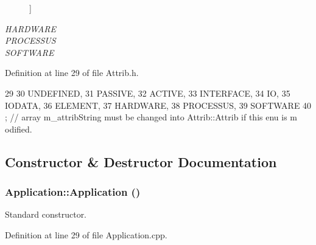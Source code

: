\begin{Desc}
\begin{description}
{}]\item[{\em 
\hypertarget{classAttrib_a69e171d7cc6417835a5a306d3c764235a61ceb22149f365f1780d18f9d1459423}{
HARDWARE}
\label{classAttrib_a69e171d7cc6417835a5a306d3c764235a61ceb22149f365f1780d18f9d1459423}
}]\item[{\em 
\hypertarget{classAttrib_a69e171d7cc6417835a5a306d3c764235a75250e29692496e73effca2c0330977f}{
PROCESSUS}
\label{classAttrib_a69e171d7cc6417835a5a306d3c764235a75250e29692496e73effca2c0330977f}
}]\item[{\em 
\hypertarget{classAttrib_a69e171d7cc6417835a5a306d3c764235a103a67cd0b8f07ef478fa45d4356e27b}{
SOFTWARE}
\label{classAttrib_a69e171d7cc6417835a5a306d3c764235a103a67cd0b8f07ef478fa45d4356e27b}
}]\end{description}
\end{Desc}



Definition at line 29 of file Attrib.h.


\begin{DoxyCode}
29                 {
30     UNDEFINED,
31     PASSIVE,
32     ACTIVE,
33     INTERFACE,
34     IO,
35     IODATA,
36     ELEMENT,
37     HARDWARE,
38     PROCESSUS,
39     SOFTWARE 
40   }; // array m_attribString must be changed into Attrib::Attrib if this enu is m
      odified. 
\end{DoxyCode}


\subsection{Constructor \& Destructor Documentation}
\hypertarget{classApplication_afa8cc05ce6b6092be5ecdfdae44e05f8}{
\subsubsection[{Application}]{\setlength{\rightskip}{0pt plus 5cm}Application::Application ()}}
\label{classApplication_afa8cc05ce6b6092be5ecdfdae44e05f8}


Standard constructor. 

Definition at line 29 of file Application.cpp.

